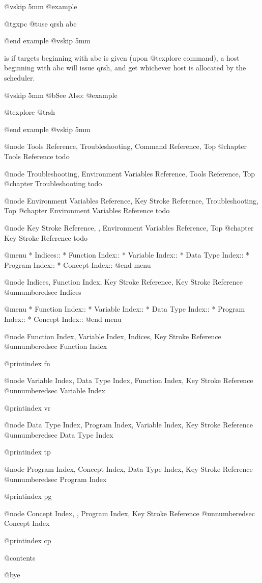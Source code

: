 @vskip 5mm
@example

  @t{gxpc} @t{use} qrsh abc

@end example
@vskip 5mm

is if targets beginning with abc is given (upon @t{explore} command),
a host beginning with abc will issue qrsh, and get whichever host
is allocated by the scheduler.

@vskip 5mm
@b{See Also:}
@example

  @t{explore} @t{rsh}

@end example
@vskip 5mm


@node Tools Reference, Troubleshooting, Command Reference, Top
@chapter Tools Reference
todo

@node Troubleshooting, Environment Variables Reference, Tools Reference, Top
@chapter Troubleshooting
todo

@node Environment Variables Reference, Key Stroke Reference, Troubleshooting, Top
@chapter Environment Variables Reference
todo

@node Key Stroke Reference,  , Environment Variables Reference, Top
@chapter Key Stroke Reference
todo

@menu
* Indices::                     
* Function Index::              
* Variable Index::              
* Data Type Index::             
* Program Index::               
* Concept Index::               
@end menu

@node Indices, Function Index, Key Stroke Reference, Key Stroke Reference
@unnumberedsec Indices

@menu
* Function Index::              
* Variable Index::              
* Data Type Index::             
* Program Index::               
* Concept Index::               
@end menu

@node Function Index, Variable Index, Indices, Key Stroke Reference
@unnumberedsec Function Index

@printindex fn

@node Variable Index, Data Type Index, Function Index, Key Stroke Reference
@unnumberedsec Variable Index

@printindex vr

@node Data Type Index, Program Index, Variable Index, Key Stroke Reference
@unnumberedsec Data Type Index

@printindex tp

@node Program Index, Concept Index, Data Type Index, Key Stroke Reference
@unnumberedsec Program Index

@printindex pg

@node Concept Index,  , Program Index, Key Stroke Reference
@unnumberedsec Concept Index

@printindex cp


@contents

@bye
                                   

